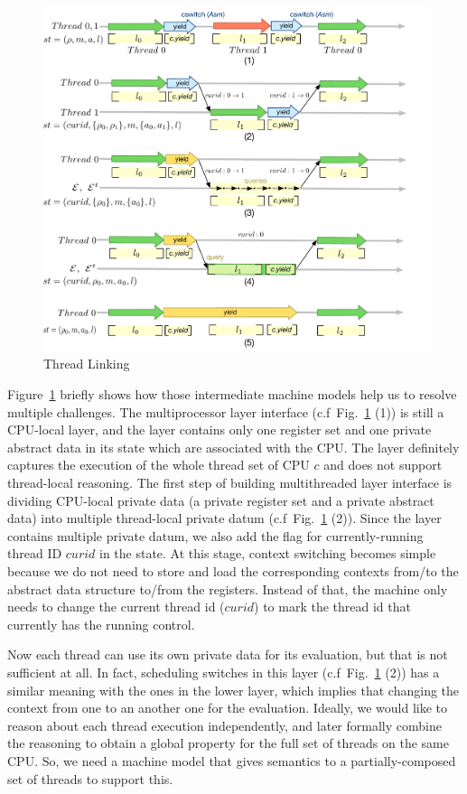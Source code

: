 \begin{figure}[t]
\includegraphics[scale=.40]{figs/ccal/thread-linking}
\caption{Thread Linking}
\label{fig:thread-linking}
\end{figure}

Figure~\ref{fig:thread-linking} briefly shows how those intermediate machine models help us to 
resolve multiple challenges.
The multiprocessor layer interface (c.f\ Fig.~\ref{fig:thread-linking} (1)) is still a CPU-local layer,
and the layer contains only one register set and one private abstract data in its state which are associated
with the CPU.
The layer definitely captures the execution of the whole thread set of CPU $c$ 
and does not support thread-local reasoning.
The first step of building multithreaded layer interface is 
dividing CPU-local private data (a private register set and a private abstract data) into multiple thread-local
private datum (c.f\ Fig.~\ref{fig:thread-linking} (2)). 
Since the layer contains multiple private datum, we also add the flag for currently-running thread ID $curid$ in the state. 
At this stage, 
context switching becomes simple because we do not need to store and load the corresponding contexts from/to 
the abstract data structure to/from the registers. 
Instead of that, the machine only needs to change the current thread id ($curid$) to mark 
the thread id that currently has the running control. 

Now each thread can use its own private data for its evaluation, but that is not sufficient at all. 
In fact, scheduling switches in this layer (c.f\ Fig.~\ref{fig:thread-linking} (2)) 
has a similar meaning with the ones in the lower layer,
which implies that changing the context from one to an another one for the evaluation.
Ideally, we would like to reason about each thread execution 
independently, and later formally combine the reasoning to obtain a global
property for the full set of threads on the same CPU.
So, we need a machine model that gives semantics to
a partially-composed set of threads to support this.

